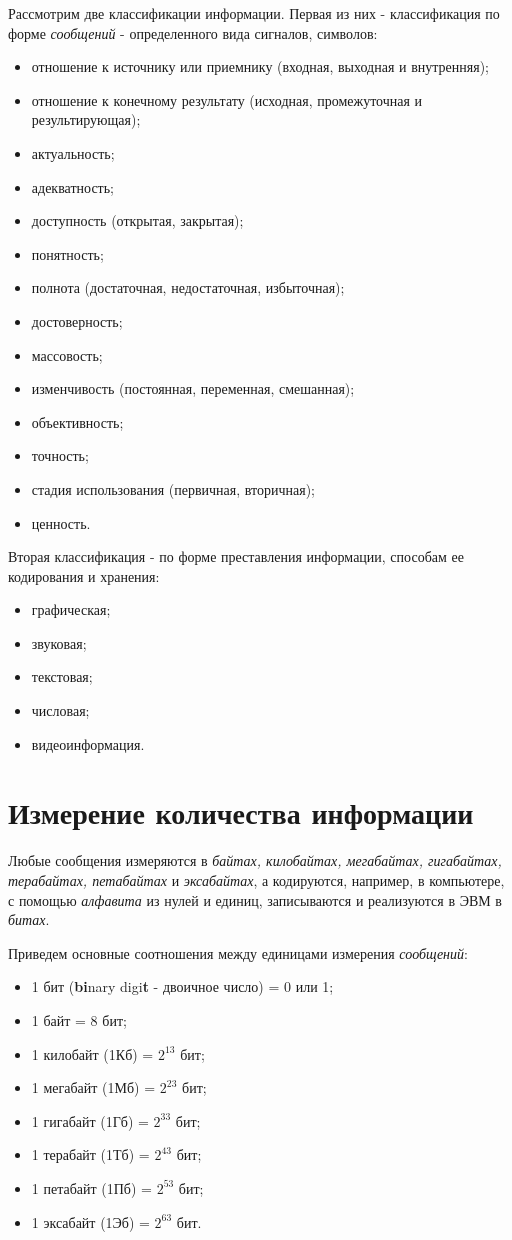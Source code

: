 Рассмотрим две классификации информации. Первая из них - классификация по форме \emph{сообщений} - определенного вида сигналов, символов:
\begin{itemize}
  \item отношение к источнику или приемнику (входная, выходная и внутренняя);
  \item отношение к конечному результату (исходная, промежуточная и результирующая);
  \item актуальность;
  \item адекватность;
  \item доступность (открытая, закрытая);
  \item понятность;
  \item полнота (достаточная, недостаточная, избыточная);
  \item достоверность;
  \item массовость;
  \item изменчивость (постоянная, переменная, смешанная);
  \item объективность;
  \item точность;
  \item стадия использования (первичная, вторичная);
  \item ценность.
\end{itemize}

Вторая классификация - по форме преставления информации, способам ее кодирования и хранения:
\begin{itemize}
  \item графическая;
  \item звуковая;
  \item текстовая;
  \item числовая;
  \item видеоинформация.
\end{itemize}

\section{Измерение количества информации}
Любые сообщения измеряются в \emph{байтах, килобайтах, мегабайтах, гигабайтах, терабайтах, петабайтах} и \emph{эксабайтах}, а кодируются, например, в компьютере, с помощью \emph{алфавита} из нулей и единиц, записываются и реализуются в ЭВМ в \emph{битах}.

Приведем основные соотношения между единицами измерения \emph{сообщений}:
\begin{itemize}
\item 1 бит (\textbf{bi}nary digi\textbf{t} - двоичное число) = 0 или 1;
\item 1 байт = 8 бит;
\item 1 килобайт (1Кб) = $2^{13}$ бит;
\item 1 мегабайт (1Мб) = $2^{23}$ бит;
\item 1 гигабайт (1Гб) = $2^{33}$ бит;
\item 1 терабайт (1Тб) = $2^{43}$ бит;
\item 1 петабайт (1Пб) = $2^{53}$ бит;
\item 1 эксабайт (1Эб) = $2^{63}$ бит.
\end{itemize}

